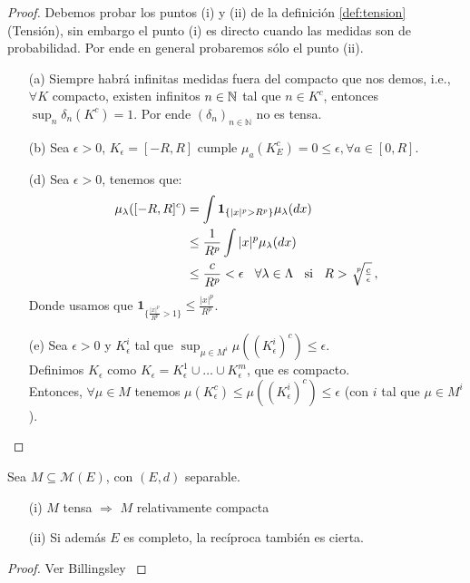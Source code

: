 \begin{proof}
\gris
Debemos probar los puntos (i) y (ii) de la definición \ref{def:tension} (Tensión), sin embargo el punto (i) es directo cuando las medidas son de probabilidad. Por ende en general probaremos sólo el punto (ii).
\begin{enumerate}
    \item[(a)] Siempre habrá infinitas medidas fuera del compacto que nos demos, i.e., $\forall K$ compacto, existen infinitos $n\in\mathbb{N}$ tal que $n\in K^c$, entonces $\displaystyle\sup_n\delta_n(K^c)=1$. Por ende $(\delta_n)_{n\in\mathbb{N}}$ no es tensa.
    \item[(b)] %
    Sea $\epsilon>0$, $K_\epsilon=[-R,R]$ cumple $\mu_a(K_E^c)=0\leq\epsilon, \forall a\in[0,R]$.
    \item[(d)] Sea $\epsilon>0$, tenemos que: %
    \begin{alignat*}{2}
        \mu_\lambda([-R,R]^c) & = \int\mathbf{1}_{\{|x|^p>R^p\}}\mu_\lambda(dx) \\
         & \leq \frac{1}{R^p}\int |x|^p\mu_\lambda(dx)\\
         & \leq \frac{c}{R^p} < \epsilon \espacio \forall \lambda \in \Lambda \espacio \text{si} \espacio R>\sqrt[\leftroot{-3}\uproot{3}p]{\tfrac{c}{\epsilon}}\, , %
    \end{alignat*}
    Donde usamos que $\mathbf{1}_{\{\frac{|x|^p}{R^p}>1\}}\leq\frac{|x|^p}{R^p}$.
    \item[(e)] Sea $\epsilon>0$ y $K_\epsilon^i$ tal que $\displaystyle\sup_{\mu\in M^i}\mu((K^i_\epsilon)^c)\leq\epsilon$.
    \\ Definimos $K_\epsilon$ como $K_\epsilon=K^1_\epsilon\cup\dots\cup K^m_\epsilon$, que es compacto.
    \\ Entonces, $\forall \mu\in M$ tenemos
    $ \mu(K_\epsilon^c)\leq\mu((K^i_\epsilon)^c)\leq\epsilon$ (con $i$ tal que $\mu\in M^i$).
\end{enumerate}
\findem \negro
\end{proof}

\begin{theorem}[Prokhorov]
\label{theorem:pro}
Sea $M\subseteq\mathcal{M}(E)$, con $(E,d)$ separable.
\begin{itemize}
    \item[(i)] $M$ tensa $\Longrightarrow$ $M$ relativamente compacta
    \item[(ii)] Si además $E$ es completo, la recíproca también es cierta.
\end{itemize}
\end{theorem}
\begin{proof}
\gris Ver Billingsley \cite{billing} \negro
\end{proof}

